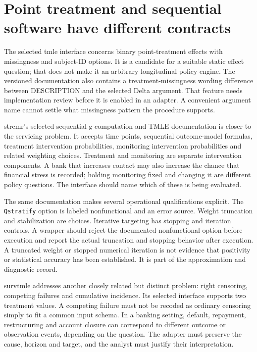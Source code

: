 \section{Point treatment and sequential software have different contracts}

The selected tmle interface concerns binary point-treatment effects with
missingness and subject-ID options. It is a candidate for a suitable static
effect question; that does not make it an arbitrary longitudinal policy engine.
The versioned documentation also contains a treatment-missingness wording
difference between DESCRIPTION and the selected Delta argument. That feature
needs implementation review before it is enabled in an adapter. A convenient
argument name cannot settle what missingness pattern the procedure supports.
\cite{v12_sw_tmle}

stremr's selected sequential g-computation and TMLE documentation is closer to
the servicing problem. It accepts time points, sequential outcome-model
formulas, treatment intervention probabilities, monitoring intervention
probabilities and related weighting choices. Treatment and monitoring are
separate intervention components. A bank that increases contact may also
increase the chance that financial stress is recorded; holding monitoring
fixed and changing it are different policy questions. The interface should
name which of these is being evaluated.\cite{v12_sw_stremr}

The same documentation makes several operational qualifications explicit.
The \texttt{Qstratify} option is labeled nonfunctional and an error source.
Weight truncation and stabilization are choices. Iterative targeting has
stopping and iteration controls. A wrapper should reject the documented
nonfunctional option before execution and report the actual truncation and
stopping behavior after execution. A truncated weight or stopped numerical
iteration is not evidence that positivity or statistical accuracy has been
established. It is part of the approximation and diagnostic record.

survtmle addresses another closely related but distinct problem: right
censoring, competing failures and cumulative incidence. Its selected interface
supports two treatment values. A competing failure must not be recoded as
ordinary censoring simply to fit a common input schema. In a banking setting,
default, repayment, restructuring and account closure can correspond to
different outcome or observation events, depending on the question. The
adapter must preserve the cause, horizon and target, and the analyst must
justify their interpretation.\cite{v12_sw_survtmle}

